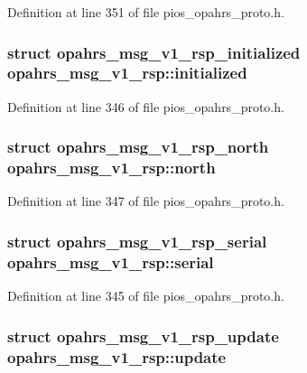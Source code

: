 Definition at line 351 of file pios\-\_\-opahrs\-\_\-proto.\-h.

\hypertarget{unionopahrs__msg__v1__rsp_a2a6bb8401a1d24136804f580cbb4e11d}{
\subsubsection[{initialized}]{\setlength{\rightskip}{0pt plus 5cm}struct {\bf opahrs\-\_\-msg\-\_\-v1\-\_\-rsp\-\_\-initialized} opahrs\-\_\-msg\-\_\-v1\-\_\-rsp\-::initialized}}\label{unionopahrs__msg__v1__rsp_a2a6bb8401a1d24136804f580cbb4e11d}


Definition at line 346 of file pios\-\_\-opahrs\-\_\-proto.\-h.

\hypertarget{unionopahrs__msg__v1__rsp_aad5973ea0cfa49bfcf5c577a3f1053d4}{
\subsubsection[{north}]{\setlength{\rightskip}{0pt plus 5cm}struct {\bf opahrs\-\_\-msg\-\_\-v1\-\_\-rsp\-\_\-north} opahrs\-\_\-msg\-\_\-v1\-\_\-rsp\-::north}}\label{unionopahrs__msg__v1__rsp_aad5973ea0cfa49bfcf5c577a3f1053d4}


Definition at line 347 of file pios\-\_\-opahrs\-\_\-proto.\-h.

\hypertarget{unionopahrs__msg__v1__rsp_a5f1415956f4771d4abb81113e2217bbb}{
\subsubsection[{serial}]{\setlength{\rightskip}{0pt plus 5cm}struct {\bf opahrs\-\_\-msg\-\_\-v1\-\_\-rsp\-\_\-serial} opahrs\-\_\-msg\-\_\-v1\-\_\-rsp\-::serial}}\label{unionopahrs__msg__v1__rsp_a5f1415956f4771d4abb81113e2217bbb}


Definition at line 345 of file pios\-\_\-opahrs\-\_\-proto.\-h.

\hypertarget{unionopahrs__msg__v1__rsp_aa3af75c186395d79e467c071f5e08103}{
\subsubsection[{update}]{\setlength{\rightskip}{0pt plus 5cm}struct {\bf opahrs\-\_\-msg\-\_\-v1\-\_\-rsp\-\_\-update} opahrs\-\_\-msg\-\_\-v1\-\_\-rsp\-::update}}\label{unionopahrs__msg__v1__rsp_aa3af75c186395d79e467c071f5e08103}


